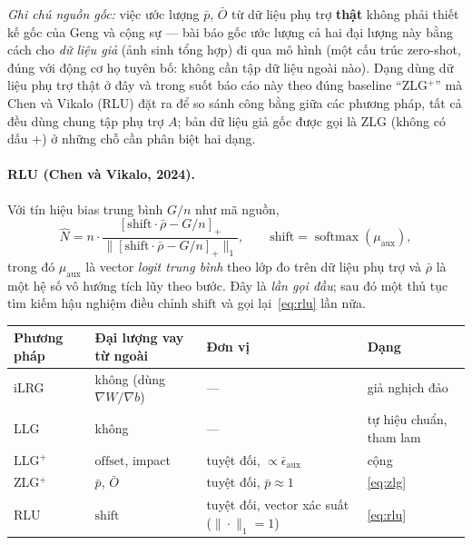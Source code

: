 \documentclass[11pt]{article}
\theoremstyle{remark}
\newcommand{\pos}[1]{\left[#1\right]_+}
\DeclareMathOperator{\softmaxop}{softmax}
\begin{document}
\emph{Ghi chú nguồn gốc:} việc ước lượng $\bar p$, $\bar O$ từ dữ liệu phụ
trợ \textbf{thật} không phải thiết kế gốc của Geng và cộng sự --- bài báo
gốc ước lượng cả hai đại lượng này bằng cách cho \emph{dữ liệu giả} (ảnh
sinh tổng hợp) đi qua mô hình (một cấu trúc zero-shot, đúng với động cơ họ
tuyên bố: không cần tập dữ liệu ngoài nào). Dạng dùng dữ liệu phụ trợ thật
ở đây và trong suốt báo cáo này theo đúng baseline ``ZLG$^+$'' mà Chen và
Vikalo (RLU) đặt ra để so sánh công bằng giữa các phương pháp, tất cả đều
dùng chung tập phụ trợ $A$; bản dữ liệu giả gốc được gọi là ZLG (không có
dấu $+$) ở những chỗ cần phân biệt hai dạng.

\paragraph{RLU (Chen và Vikalo, 2024).}
Với tín hiệu bias trung bình $G/n$ như mã nguồn,
\begin{equation}
 \widehat N = n \cdot \frac{\pos{\mathrm{shift}\cdot\bar\rho - G/n}}
                           {\bigl\|\pos{\mathrm{shift}\cdot\bar\rho - G/n}\bigr\|_1},
 \qquad \mathrm{shift} = \softmaxop(\mu_{\mathrm{aux}}),
 \label{eq:rlu}
\end{equation}
trong đó $\mu_{\mathrm{aux}}$ là vector \emph{logit trung bình} theo lớp đo
trên dữ liệu phụ trợ và $\bar\rho$ là một hệ số vô hướng tích lũy theo bước.
Đây là \emph{lần gọi đầu}; sau đó một thủ tục tìm kiếm hậu nghiệm điều chỉnh
$\mathrm{shift}$ và gọi lại~\eqref{eq:rlu} lần nữa.

\begin{center}
\footnotesize
\begin{tabular}{@{}llll@{}}
\toprule
Phương pháp & Đại lượng vay từ ngoài & Đơn vị & Dạng \\
\midrule
iLRG      & không (dùng $\nabla W/\nabla b$) & --- & giả nghịch đảo \\
LLG       & không                            & --- & tự hiệu chuẩn, tham lam \\
LLG$^+$   & $\mathrm{offset}$, impact        & tuyệt đối, $\propto \bar\epsilon_{\mathrm{aux}}$ & cộng \\
ZLG$^+$   & $\bar p$, $\bar O$               & tuyệt đối, $\bar p \approx 1$                    & \eqref{eq:zlg} \\
RLU       & $\mathrm{shift}$                 & tuyệt đối, vector xác suất ($\|\cdot\|_1=1$)    & \eqref{eq:rlu} \\
\bottomrule
\end{tabular}
\end{center}
\end{document}
